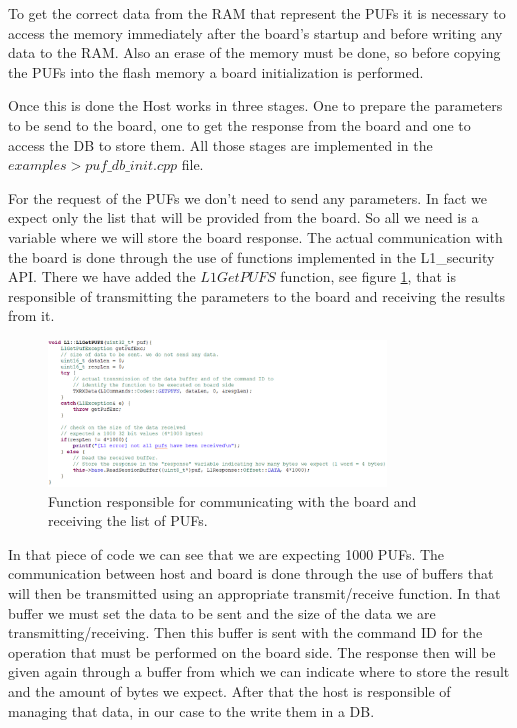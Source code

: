 To get the correct data from the RAM that represent the PUFs it is necessary to access the memory immediately after the board's startup and before writing any data to the RAM. Also an erase of the memory must be done, so before copying the PUFs into the flash memory a board initialization is performed.

Once this is done the Host works in three stages. One to prepare the parameters to be send to the board, one to get the response from the board and one to access the DB to store them. All those stages are implemented in the $examples > puf\_db\_init.cpp$ file.

For the request of the PUFs we don't need to send any parameters. In fact we expect only the list that will be provided from the board. So all we need is a variable where we will store the board response.
The actual communication with the board is done through the use of functions implemented in the L1\_security API. There we have added the $L1GetPUFS$ function, see figure \ref{fig:L1GetPUFS}, that is responsible of transmitting the parameters to the board and receiving the results from it.

\begin{figure}[h!]
	\vspace{0.5cm}
	\includegraphics[width = 0.8\textwidth]{images/L1GetPUFS.png}
	\caption{Function responsible for communicating with the board and receiving the list of PUFs. }
	\label{fig:L1GetPUFS}
\end{figure}

In that piece of code we can see that we are expecting 1000 PUFs. The communication between host and board is done through the use of buffers that will then be transmitted using an appropriate transmit/receive function. In that buffer we must set the data to be sent and the size of the data we are transmitting/receiving. Then this buffer is sent with the command ID for the operation that must be performed on the board side. The response then will be given again through a buffer from which we can indicate where to store the result and the amount of bytes we expect. After that the host is responsible of managing that data, in our case to the write them in a DB.

